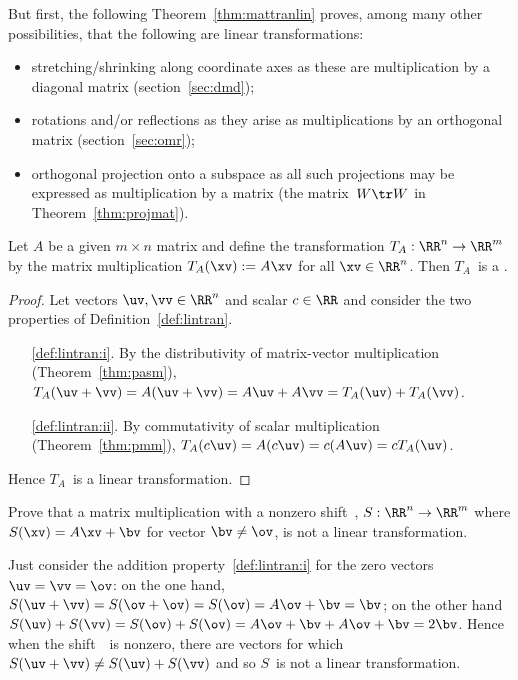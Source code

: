 \begin{example} \label{eg:}
But first, the following Theorem~\ref{thm:mattranlin} proves, among many other possibilities, that the following are linear transformations:
\begin{itemize}
\item stretching\slash shrinking along coordinate axes as these are multiplication by a diagonal matrix (section~\ref{sec:dmd});
\item rotations and/or reflections as they arise as multiplications by an orthogonal matrix (section~\ref{sec:omr});
\item orthogonal projection onto a subspace as all such projections may be expressed as multiplication by a matrix (the matrix~\(W\tr W\) in Theorem~\ref{thm:projmat}).
\end{itemize}
\end{example}


\begin{theorem} \label{thm:mattranlin} 
Let \(A\) be a given \(m\times n\) matrix and define the transformation \(T_A:\RR^n\to\RR^m\)  by the matrix multiplication \(T_A(\xv):=A\xv\) for all \(\xv\in\RR^n\). 
Then \(T_A\)~is a .
\end{theorem}
\begin{proof} 
Let vectors \(\uv,\vv\in\RR^n\) and scalar \(c\in\RR\) and consider the two properties of Definition~\ref{def:lintran}.
\begin{itemize}
\item[\ref{def:lintran:i}.] By the distributivity of matrix-vector multiplication (Theorem~\ref{thm:pasm}), \(T_A(\uv+\vv)=A(\uv+\vv)=A\uv+A\vv=T_A(\uv)+T_A(\vv)\).
\item[\ref{def:lintran:ii}.] By commutativity of scalar multiplication (Theorem~\ref{thm:pmm}), \(T_A(c\uv)=A(c\uv)=c(A\uv)=cT_A(\uv)\).
\end{itemize}
Hence \(T_A\)~is a linear transformation.
\end{proof}



\begin{example} \label{eg:}
Prove that a matrix multiplication with a nonzero shift~\bv, \(S:\RR^n\to\RR^m\) where \(S(\xv)=A\xv+\bv\) for vector \(\bv\neq\ov\), is not a linear transformation.
\begin{solution} 
Just consider the addition property~\ref{def:lintran:i} for the zero vectors \(\uv=\vv=\ov\):  
on the one hand, \(S(\uv+\vv)=S(\ov+\ov)=S(\ov)=A\ov+\bv=\bv\); 
on the other hand \(S(\uv)+S(\vv)=S(\ov)+S(\ov)=A\ov+\bv+A\ov+\bv=2\bv\).  
Hence when the shift~\bv\ is nonzero, there are vectors for which \(S(\uv+\vv)\neq S(\uv)+S(\vv)\) and so \(S\)~is not a linear transformation.
\end{solution}
\end{example}



